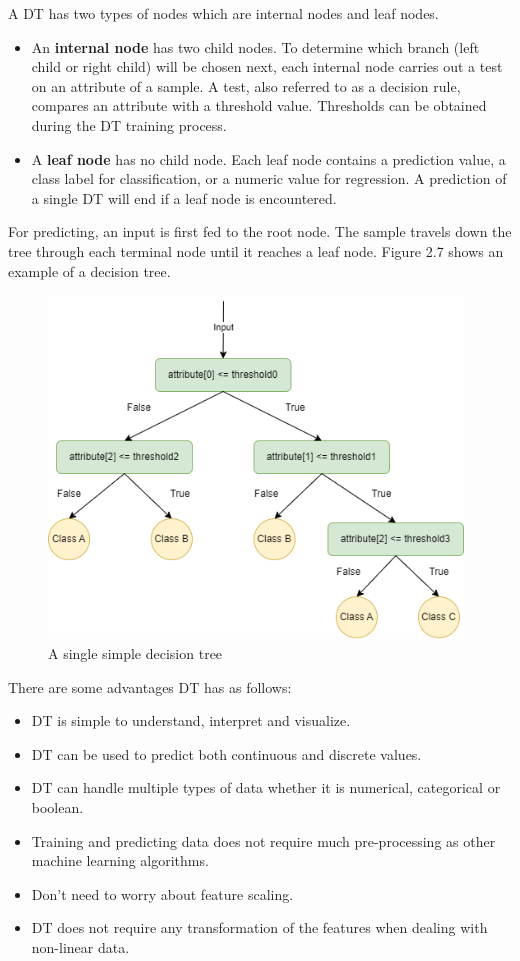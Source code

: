\documentclass[a4paper, 12pt]{report}
\begin{document}
A DT has two types of nodes which are internal nodes and leaf nodes.
\begin{itemize}
\item An \textbf{internal node} has two child nodes. To determine which branch (left child or right child) will be chosen next, each internal node carries out a test on an attribute of a sample. A test, also referred to as a decision rule, compares an attribute with a threshold value. Thresholds can be obtained during the DT training process.
\item A \textbf{leaf node} has no child node. Each leaf node contains a prediction value, a class label for classification, or a numeric value for regression. A prediction of a single DT will end if a leaf node is encountered.
\end{itemize}
For predicting, an input is first fed to the root node. The sample travels down the tree through each terminal node until it reaches a leaf node. Figure 2.7 shows an example of a decision tree.
\begin{center}
    \begin{figure}[H]
        \begin{center}
            \includegraphics[width=11cm]{picture/algo/decisiontree.drawio.png}
        \end{center}
        \caption{A single simple decision tree}
        \label{ref Figure}
    \end{figure}
\end{center}
There are some advantages DT has as follows:
\begin{itemize}
    \item DT is simple to understand, interpret and visualize.
    \item DT can be used to predict both continuous and discrete values.
    \item DT can handle multiple types of data whether it is numerical, categorical or boolean.
    \item Training and predicting data does not require much pre-processing as other
machine learning algorithms.
    \item Don't need to worry about feature scaling.
    \item DT does not require any transformation of the features when dealing with non-linear data.
\end{itemize}
\end{document}
